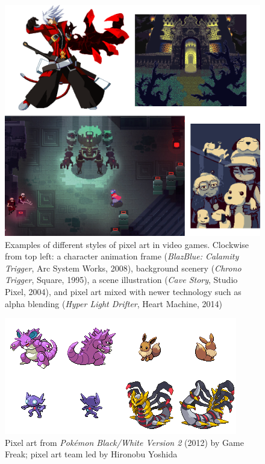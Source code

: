 \documentclass[12pt,twoside,notitlepage]{report}
\begin{document}
\begin{figure}[h!]
\centering
\includegraphics[width=\textwidth]{pixelartexamples}
\caption{Examples of different styles of pixel art in video games. Clockwise from top left: a character animation frame (\textit{BlazBlue: Calamity Trigger}, Arc System Works, 2008), background scenery (\textit{Chrono Trigger}, Square, 1995), a scene illustration (\textit{Cave Story}, Studio Pixel, 2004), and pixel art mixed with newer technology such as alpha blending (\textit{Hyper Light Drifter}, Heart Machine, 2014)}
\label{fig:pixelexamples}
\end{figure}

\begin{figure}[h!]
\centering
\includegraphics[width=\textwidth]{pokemonsprites}
\caption{Pixel art from \textit{Pok\'{e}mon Black/White Version 2} (2012) by Game Freak; pixel art team led by Hironobu Yoshida}
\end{figure}
\end{document}
